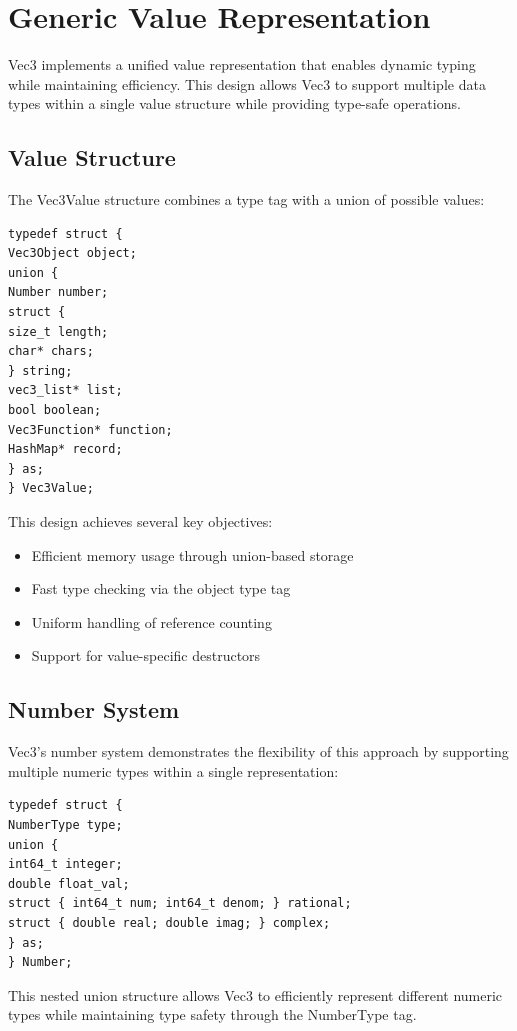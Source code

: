 \section{Generic Value Representation}
\label{sec:generic-value}
Vec3 implements a unified value representation that enables dynamic typing while maintaining efficiency. This design allows Vec3 to support multiple data types within a single value structure while providing type-safe operations.
\subsection{Value Structure}
The Vec3Value structure combines a type tag with a union of possible values:
\begin{verbatim}
typedef struct {
Vec3Object object;
union {
Number number;
struct {
size_t length;
char* chars;
} string;
vec3_list* list;
bool boolean;
Vec3Function* function;
HashMap* record;
} as;
} Vec3Value;
\end{verbatim}
This design achieves several key objectives:
\begin{itemize}
\item Efficient memory usage through union-based storage
\item Fast type checking via the object type tag
\item Uniform handling of reference counting
\item Support for value-specific destructors
\end{itemize}
\subsection{Number System}
Vec3's number system demonstrates the flexibility of this approach by supporting multiple numeric types within a single representation:
\begin{verbatim}
typedef struct {
NumberType type;
union {
int64_t integer;
double float_val;
struct { int64_t num; int64_t denom; } rational;
struct { double real; double imag; } complex;
} as;
} Number;
\end{verbatim}
This nested union structure allows Vec3 to efficiently represent different numeric types while maintaining type safety through the NumberType tag.
